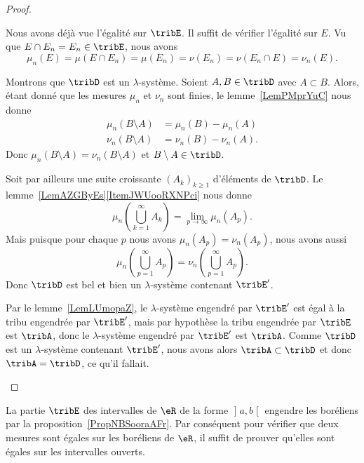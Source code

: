 \begin{proof}
\begin{subproof}
		\spitem[\( \mu_n=\nu_n\) sur \( \tribE'\)]
		Nous avons déjà vue l'égalité sur \( \tribE\). Il suffit de vérifier l'égalité sur \( E\). Vu que \( E\cap E_n=E_n\in\tribE\), nous avons
		\begin{equation}
			\mu_n(E)=\mu(E\cap E_n)=\mu(E_n)=\nu(E_n)=\nu(E_n\cap E)=\nu_n(E).
		\end{equation}

		Montrons que \( \tribD\) est un \( \lambda\)-système. Soient \( A,B\in\tribD\) avec \( A\subset B\). Alors, étant donné que les mesures \( \mu_n\) et \( \nu_n\) sont finies, le lemme~\ref{LemPMprYuC} nous donne
		\begin{subequations}
			\begin{align}
				\mu_n(B\setminus A) & =\mu_n(B)-\mu_n(A)  \\
				\nu_n(B\setminus A) & =\nu_n(B)-\nu_n(A).
			\end{align}
		\end{subequations}
		Donc \( \mu_n(B\setminus A)=\nu_n(B\setminus A)\) et \( B\setminus A\in\tribD\).

		Soit par ailleurs une suite croissante \( (A_k)_{k\geq 1}\) d'éléments de \( \tribD\). Le lemme~\ref{LemAZGByEs}\ref{ItemJWUooRXNPci} nous donne
		\begin{equation}
			\mu_n(\bigcup_{k=1}^{\infty}A_k)=\lim_{p\to \infty} \mu_n(A_p).
		\end{equation}
		Mais puisque pour chaque \( p\) nous avons \( \mu_n(A_p)=\nu_n(A_p)\), nous avons aussi
		\begin{equation}
			\mu_n(\bigcup_{p=1}^{\infty}A_p)=\nu_n(\bigcup_{p=1}^{\infty}A_p).
		\end{equation}
		Donc \( \tribD\) est bel et bien un \( \lambda\)-système contenant \( \tribE'\).

		\spitem[Conclusion]
		Par le lemme~\ref{LemLUmopaZ}, le \( \lambda\)-système engendré par \( \tribE'\) est égal à la tribu engendrée par \( \tribE'\), mais par hypothèse la tribu engendrée par \( \tribE\) est \( \tribA\), donc le \( \lambda\)-système engendré par \( \tribE'\) est \( \tribA\). Comme \( \tribD\) est un \( \lambda\)-système contenant \( \tribE'\), nous avons alors \( \tribA\subset\tribD\) et donc \( \tribA=\tribD\), ce qu'il fallait.
	\end{subproof}
\end{proof}

\begin{example}\label{ExDMPoohtNAj}
	La partie \( \tribE\) des intervalles de \( \eR\) de la forme \( \mathopen] a , b \mathclose[\) engendre les boréliens par la proposition~\ref{PropNBSooraAFr}. Par conséquent pour vérifier que deux mesures sont égales sur les boréliens de \( \eR\), il suffit de prouver qu'elles sont égales sur les intervalles ouverts.
\end{example}

